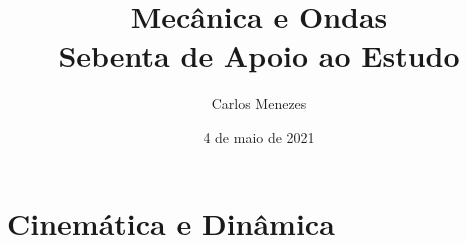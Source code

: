 \documentclass[a4paper, 12pt]{article}
\title{Mecânica e Ondas\\ \Large{Sebenta de Apoio ao Estudo}}
\author{Carlos Menezes}
\date{4 de maio de 2021}
\begin{document}
\maketitle

\newpage

\tableofcontents

\newpage
\newpage

\part{Cinemática e Dinâmica}

\newpage



\newpage



\newpage



\newpage
\newpage
\end{document}
